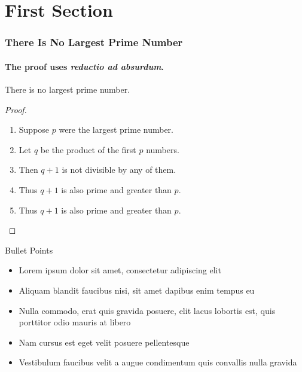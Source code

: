 \documentclass[aspectratio=169,xcolor=dvipsnames]{beamer}
\begin{document}
\section{First Section}
\begin{frame}
	\frametitle{There  Is  No  Largest  Prime  Number}
	\framesubtitle{The  proof  uses  \textit{reductio  ad  absurdum}.}
	\begin{theorem}
		There  is  no  largest  prime  number.
	\end{theorem}
	\begin{proof}
		\begin{enumerate}
			\item<1-|  alert@1>  Suppose  $p$  were  the  largest  prime  number.
			\item<2-3,5>  Let  $q$  be  the  product  of  the  first  $p$  numbers.
			\item<3->  Then  $q+1$  is  not  divisible  by  any  of  them.
			\item<4->  Thus  $q+1$  is  also  prime  and  greater  than  $p$.
			\item<5->  Thus  $q+1$  is  also  prime  and  greater  than  $p$.\qedhere
		\end{enumerate}
	\end{proof}
\end{frame}
\begin{frame}{Bullet Points}
    \begin{itemize}
        \item<2,7> Lorem ipsum dolor sit amet, consectetur adipiscing elit
        	\vspace{1em}
        \item<3,7> Aliquam blandit faucibus nisi, sit amet dapibus enim tempus eu
        	\vspace{1em}
        \item<4,7> Nulla commodo, erat quis gravida posuere, elit lacus lobortis est, quis porttitor odio mauris at libero
        	\vspace{1em}
        \item<5,7> Nam cursus est eget velit posuere pellentesque
         	\vspace{1em}
        \item<6,7> Vestibulum faucibus velit a augue condimentum quis convallis nulla gravida
    \end{itemize}
\end{frame}
\end{document}

